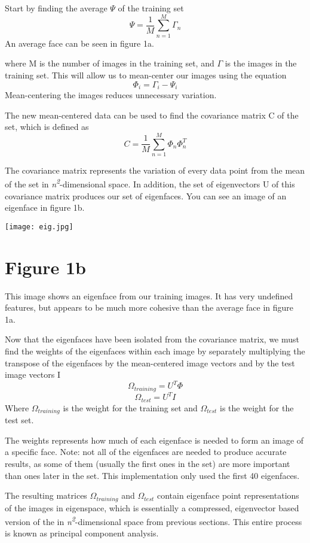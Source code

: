 \documentclass{tufte-handout}
\begin{document}
\vspace{2mm}Start by finding the average \(\Psi \) of the training set
\[\Psi = \frac{1}{M}\sum_{n=1}^{M} \Gamma_n\]
An average face can be seen in figure 1a.

where M is the number of images in the training set, and \(\Gamma\) is the images in the training set. This will allow us to mean-center our images using the equation 
\[\Phi_i = \Gamma_i - \Psi_i\]
Mean-centering the images reduces unnecessary variation.

The new mean-centered data can be used to find the covariance matrix C of the set, which is defined as
\[C = \frac{1}{M}\sum_{n=1}^{M}\Phi_n\Phi_n^T\]

The covariance matrix represents the variation of every data point from the mean of the set in \textit{n\textsuperscript{2}}-dimensional space. In addition, the set of eigenvectors U of this covariance matrix produces our set of eigenfaces. You can see an image of an eigenface in figure 1b.

\begin{marginfigure}
\texttt{[image: eig.jpg]}
\section{Figure 1b}
This image shows an eigenface from our training images. It has very undefined features, but appears to be much more cohesive than the average face in figure 1a.

\end{marginfigure}

Now that the eigenfaces have been isolated from the covariance matrix, we must find the weights of the eigenfaces within each image by separately multiplying the transpose of the eigenfaces by the mean-centered image vectors and by the test image vectors I 
\[\Omega_{training}=U^T\Phi\]
\[\Omega_{test}=U^T I\]
Where \(\Omega_{training}\) is the weight for the training set and \(\Omega_{test}\) is the weight for the test set.

The weights represents how much of each eigenface is needed to form an image of a specific face. Note: not all of the eigenfaces are needed to produce accurate results, as some of them (usually the first ones in the set) are more \textsc{}important\textsc{} than ones later in the set. This implementation only used the first 40 eigenfaces.

The resulting matrices \(\Omega_{training}\) and \(\Omega_{test}\) contain eigenface point representations of the images in eigenspace, which is essentially a compressed, eigenvector based version of the in \textit{n\textsuperscript{2}}-dimensional space from previous sections. This entire process is known as principal component analysis.
\end{document}
